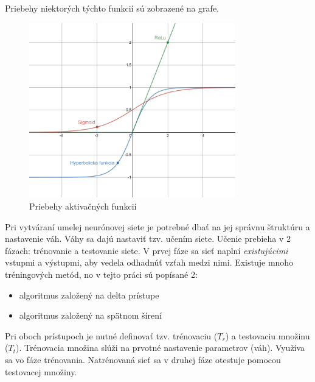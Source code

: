 Priebehy niektorých týchto funkcií sú zobrazené na grafe.
\begin{figure}[H]
    \centering
    \includegraphics[width=0.8\textwidth]{images/activation-functions.png}
    \caption{Priebehy aktivačných funkcií}
\end{figure}\label{figure:activation-functions}

Pri vytváraní umelej neurónovej siete je potrebné dbať na jej správnu štruktúru a nastavenie váh.
Váhy sa dajú nastaviť tzv. učením siete.
Učenie prebieha v 2 fázach: trénovanie a testovanie siete.
V prvej fáze sa sieť naplní \emph{existujúcimi} vstupmi a výstupmi, aby vedela odhadnúť vzťah medzi nimi.
Existuje mnoho tréningových metód, no v tejto práci sú popísané 2:
\begin{itemize}
    \item algoritmus založený na delta prístupe
    \item algoritmus založený na spätnom šírení
\end{itemize}
Pri oboch prístupoch je nutné definovať tzv. trénovaciu ($T_r$) a testovaciu množinu ($T_t$).
Trénovacia množina slúži na prvotné nastavenie parametrov (váh).
Využíva sa vo fáze trénovania.
Natrénovaná sieť sa v druhej fáze otestuje pomocou testovacej množiny.

